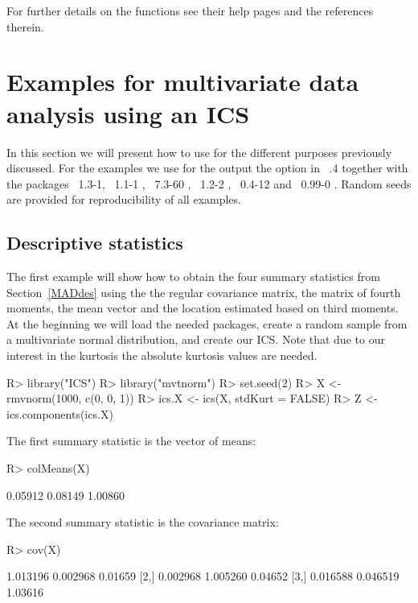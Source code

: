 \documentclass[article,nojss]{jss}
\begin{document}
For further details on the functions see their help pages and the references therein.



\section{Examples for multivariate data analysis using an ICS}\label{EX}

In this section we will present how to use  for the
different purposes previously discussed. For the examples we use for
the output the option  in
~.4 \citep{R272} together with the packages
~1.3-1,
~1.1-1 \citep{ICSNP2007},
~7.3-60 \citep{MASS2002},
~1.2-2 \citep{mvtnorm2008},
~0.4-12 \citep{pixmap2008} and
~0.99-0 \citep{robustbase2008}.
Random seeds are provided for reproducibility of all examples.

\subsection{Descriptive statistics}\label{EXdes}

The first example will show how to obtain the four summary statistics from Section~\ref{MADdes} using the the regular covariance matrix, the matrix of fourth moments, the mean vector
and the location estimated based on third moments. At the beginning we will load the needed packages, create a random sample from a multivariate normal distribution, and create our ICS.
Note that due to our interest in the kurtosis the absolute kurtosis values are needed.
\begin{Schunk}
\begin{Sinput}
R> library("ICS")
R> library("mvtnorm")
R> set.seed(2)
R> X <- rmvnorm(1000, c(0, 0, 1))
R> ics.X <- ics(X, stdKurt = FALSE)
R> Z <- ics.components(ics.X)
\end{Sinput}
\end{Schunk}
The first summary statistic is the vector of means:
\begin{Schunk}
\begin{Sinput}
R> colMeans(X)
\end{Sinput}
\begin{Soutput}
[1] 0.05912 0.08149 1.00860
\end{Soutput}
\end{Schunk}

The second summary statistic is the covariance matrix:
\begin{Schunk}
\begin{Sinput}
R> cov(X)
\end{Sinput}
\begin{Soutput}
         [,1]     [,2]    [,3]
[1,] 1.013196 0.002968 0.01659
[2,] 0.002968 1.005260 0.04652
[3,] 0.016588 0.046519 1.03616
\end{Soutput}
\end{Schunk}
\end{document}
